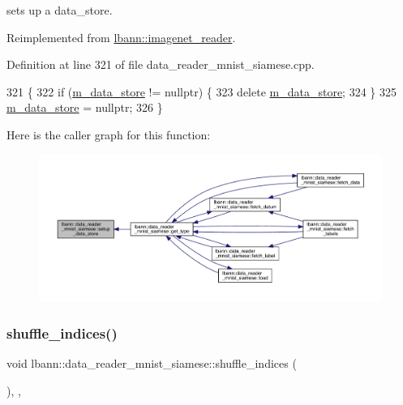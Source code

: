 sets up a data\+\_\+store. 



Reimplemented from \hyperlink{classlbann_1_1imagenet__reader_a17af38eff1c3aee001d263248b8406a1}{lbann\+::imagenet\+\_\+reader}.



Definition at line 321 of file data\+\_\+reader\+\_\+mnist\+\_\+siamese.\+cpp.


\begin{DoxyCode}
321                                                          \{
322   \textcolor{keywordflow}{if} (\hyperlink{classlbann_1_1generic__data__reader_aefc076b842933a882214f4f709ca49c9}{m\_data\_store} != \textcolor{keyword}{nullptr}) \{
323     \textcolor{keyword}{delete} \hyperlink{classlbann_1_1generic__data__reader_aefc076b842933a882214f4f709ca49c9}{m\_data\_store};
324   \}
325   \hyperlink{classlbann_1_1generic__data__reader_aefc076b842933a882214f4f709ca49c9}{m\_data\_store} = \textcolor{keyword}{nullptr};
326 \}
\end{DoxyCode}
Here is the caller graph for this function\+:\nopagebreak
\begin{figure}[H]
\begin{center}
\leavevmode
\includegraphics[width=350pt]{classlbann_1_1data__reader__mnist__siamese_a410d8aa510fb2f3f4d1a257d5b308819_icgraph}
\end{center}
\end{figure}
\mbox{\label{classlbann_1_1data__reader__mnist__siamese_ad1949fc1a71af86d792e927c0181f87d}} 
\subsubsection{\texorpdfstring{shuffle\+\_\+indices()}{shuffle\_indices()}}
{\footnotesize\ttfamily void lbann\+::data\+\_\+reader\+\_\+mnist\+\_\+siamese\+::shuffle\+\_\+indices (\begin{DoxyParamCaption}{ }\end{DoxyParamCaption})\hspace{0.3cm}{\ttfamily [override]}, {\ttfamily [protected]}, {\ttfamily [virtual]}}


